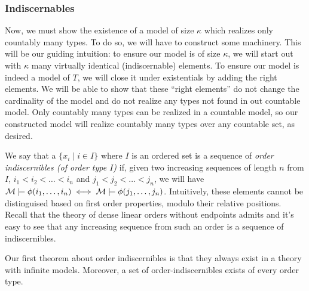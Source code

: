 \subsubsection{Indiscernables}
Now, we must show the existence of a model of size \(\kappa\) which realizes only countably many types. To do so, we will have to construct some machinery.
This will be our guiding intuition: to ensure our model is of size \(\kappa\), we will start out with \(\kappa\) many virtually identical (indiscernable) elements. 
To ensure our model is indeed a model of \(T\), we will close it under existentials by adding the right elements. 
We will be able to show that these ``right elements'' do not change the cardinality of the model and do not realize any types not found in out countable model.
Only countably many types can be realized in a countable model, so our constructed model will realize countably many types over any countable set, as desired. 

\begin{definition}\label{definition_order_indiscernibles}
We say that a \(\{x_i \mid i \in I\}\) where \(I\) is an ordered set is a sequence of \textit{order indiscernibles (of order type \(I\))} if, given two increasing sequences of length \(n\) from \(I\), 
\(i_1 < i_2 < \ldots < i_n\) and \(j_1 < j_2 < \ldots < j_n\), we will have \(\mathcal{M} \models \phi(i_1, \ldots, i_n) \iff \mathcal{M} \models \phi(j_1, \ldots, j_n)\). 
Intuitively, these elements cannot be distinguised based on first order properties, modulo their relative positions.  
Recall that the theory of dense linear orders without endpoints admits \qe and it's easy to see that any increasing sequence from such an order is a sequence of indiscernibles. 
\end{definition}


Our first theorem about order indiscernibles is that they always exist in a theory with infinite models.
Moreover, a set of order-indiscernibles exists of every order type.

